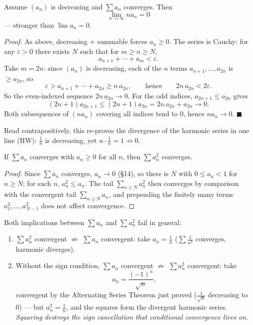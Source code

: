 \documentclass[11pt]{report}
\begin{document}
\begin{exbox}
Assume $(a_n)$ is decreasing and $\sum a_n$ converges. Then
\[
\lim_{n\to\infty} n a_n = 0
\]
--- stronger than $\lim a_n = 0$.

\emph{Proof.} As above, decreasing $+$ summable forces $a_n \geq 0$. The series is Cauchy: for any $\varepsilon > 0$ there exists $N$ such that for $m \geq n \geq N$,
\[
a_{n+1} + \cdots + a_m < \varepsilon.
\]
Take $m = 2n$: since $(a_n)$ is decreasing, each of the $n$ terms $a_{n+1}, \ldots, a_{2n}$ is $\geq a_{2n}$, so
\[
\varepsilon > a_{n+1} + \cdots + a_{2n} \geq n\, a_{2n}, \qquad \text{hence} \qquad 2n\, a_{2n} < 2\varepsilon.
\]
So the even-indexed sequence $2n\, a_{2n} \to 0$. For the odd indices, $a_{2n+1} \leq a_{2n}$ gives
\[
(2n+1) a_{2n+1} \leq (2n+1) a_{2n} = 2n\, a_{2n} + a_{2n} \longrightarrow 0.
\]
Both subsequences of $(n a_n)$ covering all indices tend to $0$, hence $n a_n \to 0$. \hfill $\blacksquare$

Read contrapositively, this re-proves the divergence of the harmonic series in one line (HW): $\tfrac1n$ is decreasing, yet $n \cdot \tfrac1n = 1 \not\to 0$.
\end{exbox}

\begin{propbox}
If $\sum a_n$ converges with $a_n \geq 0$ for all $n$, then $\sum a_n^2$ converges.
\end{propbox}

\begin{proof}
Since $\sum a_n$ converges, $a_n \to 0$ (\S 14), so there is $N$ with $0 \leq a_n < 1$ for $n \geq N$; for such $n$, $a_n^2 \leq a_n$. The tail $\sum_{n \geq N} a_n^2$ then converges by comparison with the convergent tail $\sum_{n \geq N} a_n$, and prepending the finitely many terms $a_1^2, \ldots, a_{N-1}^2$ does not affect convergence.
\end{proof}

\begin{rembox}
Both implications between $\sum a_n$ and $\sum a_n^2$ fail in general:
\begin{enumerate}[label=(\arabic*)]
    \item $\sum a_n^2$ convergent $\not\Rightarrow$ $\sum a_n$ convergent: take $a_n = \tfrac1n$ ($\sum \tfrac{1}{n^2}$ converges, harmonic diverges).
    \item Without the sign condition, $\sum a_n$ convergent $\not\Rightarrow$ $\sum a_n^2$ convergent: take
    \[
    a_n = \frac{(-1)^n}{\sqrt n},
    \]
    convergent by the Alternating Series Theorem just proved ($\tfrac{1}{\sqrt n}$ decreasing to $0$) --- but $a_n^2 = \tfrac1n$, and the squares form the divergent harmonic series. \emph{Squaring destroys the sign cancellation that conditional convergence lives on.}
\end{enumerate}
\end{rembox}
\end{document}
